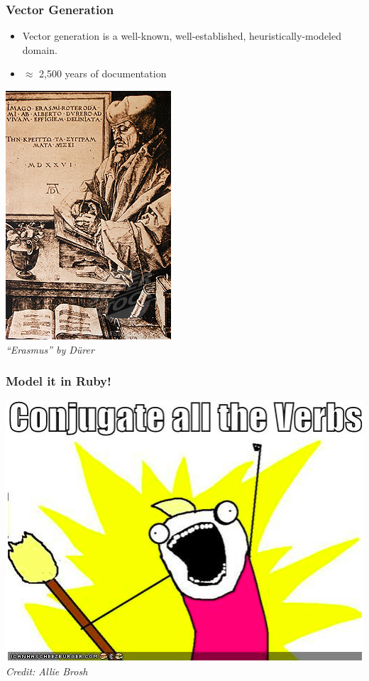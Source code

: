 \documentclass[slidestop,compress,mathserif]{beamer}
\begin{document}
\begin{frame}
	\frametitle{Vector Generation}
	\begin{itemize}
		\item Vector generation is a well-known, well-established, heuristically-modeled domain.
		\pause
		\item $\approx$ 2,500 years of documentation
	\end{itemize}
	\begin{center}
		\includegraphics[scale=0.5]{img/erasmus.jpg} \\
		\pause
		\emph{``Erasmus'' by D\"{u}rer}
	\end{center}

\end{frame}

\begin{frame}
	\frametitle{Model it in Ruby!}
	\begin{center}
		\includegraphics[scale=0.45]{img/brosh_all.png}
		\vskip 0.5cm
		\emph{Credit:  Allie Brosh}
	\end{center}
\end{frame}
\end{document}
